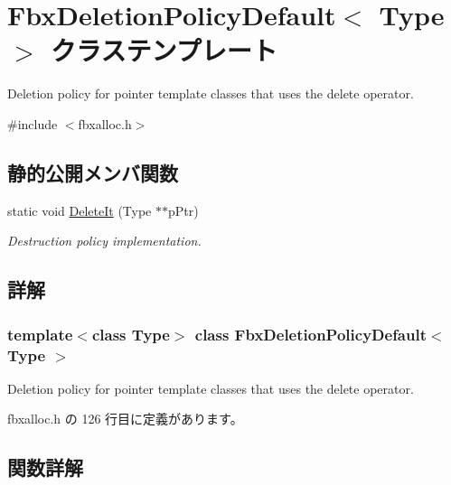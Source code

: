 \hypertarget{class_fbx_deletion_policy_default}{}\section{Fbx\+Deletion\+Policy\+Default$<$ Type $>$ クラステンプレート}
\label{class_fbx_deletion_policy_default}


Deletion policy for pointer template classes that uses the delete operator.  




{\ttfamily \#include $<$fbxalloc.\+h$>$}

\subsection*{静的公開メンバ関数}
\begin{DoxyCompactItemize}
\item 
static void \hyperlink{class_fbx_deletion_policy_default_a6f1fb89b306b4b1bf88d5be8aaf1d83e}{Delete\+It} (Type $\ast$$\ast$p\+Ptr)
\begin{DoxyCompactList}\small\item\em Destruction policy implementation. \end{DoxyCompactList}\end{DoxyCompactItemize}


\subsection{詳解}
\subsubsection*{template$<$class Type$>$\newline
class Fbx\+Deletion\+Policy\+Default$<$ Type $>$}

Deletion policy for pointer template classes that uses the delete operator. 

 fbxalloc.\+h の 126 行目に定義があります。



\subsection{関数詳解}
\mbox{\label{class_fbx_deletion_policy_default_a6f1fb89b306b4b1bf88d5be8aaf1d83e}} 
